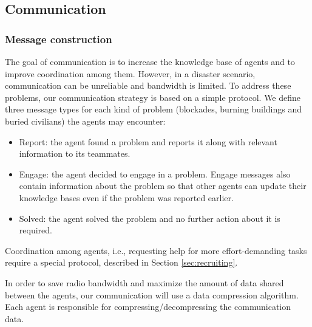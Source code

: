 \subsection{Communication}
\label{sec:communication}

\subsubsection{Message construction}
The goal of communication is to increase the knowledge base of agents and to improve coordination among them. However, in a disaster scenario, communication can be unreliable and bandwidth is limited. To address these problems, our communication strategy is based on a simple protocol. We define three message types for each kind of problem (blockades, burning buildings and buried civilians) the agents may encounter:

\begin{itemize}
 \item Report: the agent found a problem and reports it along with relevant information to its teammates. %

 \item Engage: the agent decided to engage in a problem. Engage messages also contain information about the problem so that other agents can update their knowledge bases even if the problem was reported earlier.

 \item Solved: the agent solved the problem and no further action about it is required. %
\end{itemize}

Coordination among agents, i.e., requesting help for more effort-demanding tasks require a special protocol, described in Section \ref{sec:recruiting}.

In order to save radio bandwidth and maximize the amount of data shared between the agents, our communication will use a data compression algorithm. Each agent is responsible for compressing/decompressing the communication data.

